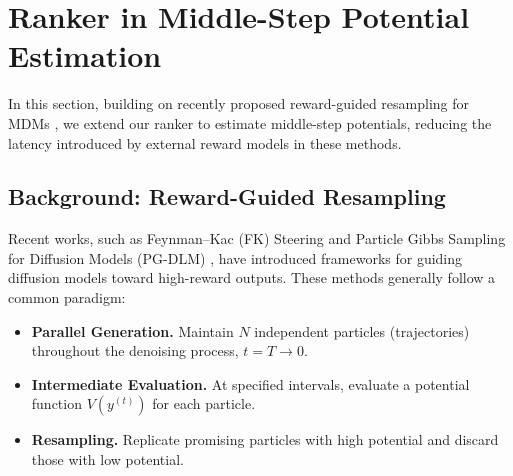 \documentclass{article}
\newcommand{\method}{\text{Diffusion Ranker}\xspace}
\begin{document}


\section{Ranker in Middle-Step Potential Estimation}

In this section, building on recently proposed reward-guided resampling for MDMs \citep{singhal2025fk,dang2025inference}, we extend our ranker to estimate middle-step potentials, reducing the latency introduced by external reward models in these methods.

\subsection{Background: Reward-Guided Resampling}

Recent works, such as Feynman–Kac (FK) Steering \citep{singhal2025fk} and Particle Gibbs Sampling for Diffusion Models (PG-DLM) \citep{dang2025inference}, have introduced frameworks for guiding diffusion models toward high-reward outputs. These methods generally follow a common paradigm:

\begin{itemize}
    \item \textbf{Parallel Generation.} Maintain $N$ independent particles (trajectories) throughout the denoising process, $t = T \to 0$.
    \item \textbf{Intermediate Evaluation.} At specified intervals, evaluate a potential function $V(y^{(t)})$ for each particle.
    \item \textbf{Resampling.} Replicate promising particles with high potential and discard those with low potential.
\end{itemize}
\end{document}
